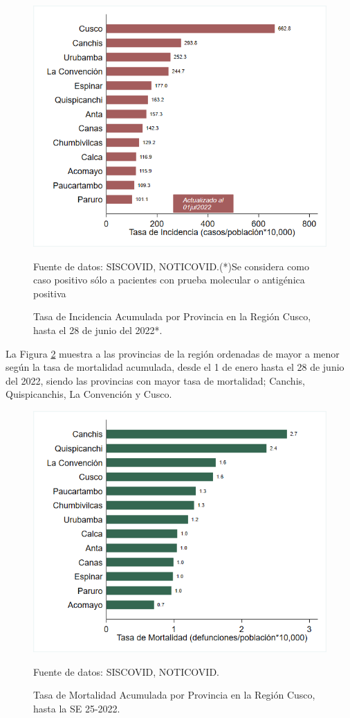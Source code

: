 \documentclass[12pt,a4paper,openany]{book}
\begin{document}
	\begin{figure}[!htpb]
		\caption{Tasa de Incidencia Acumulada por Provincia en la Región Cusco, hasta el 28 de junio del 2022*. }\label{fig:incidencia_provincias}
		\begin{center}
			\includegraphics[width=0.60\linewidth]{../figuras/incidencia_provincial_2022.png}
		\end{center}
		{\footnotesize {
				Fuente de datos: SISCOVID, NOTICOVID.(*)Se considera como caso positivo sólo a pacientes con prueba molecular o antigénica positiva}}
	\end{figure}
	
	La Figura \ref{fig:mortalidad_ordenada} muestra a las provincias de la región ordenadas de mayor a menor según la tasa de mortalidad acumulada, desde el 1 de enero hasta el 28 de junio del 2022, siendo las provincias con mayor tasa de mortalidad;  Canchis, Quispicanchis, La Convención y Cusco.  
	
	\begin{figure}[h]
		\caption{Tasa de Mortalidad Acumulada por Provincia en la Región Cusco, hasta la SE 25-2022. }\label{fig:mortalidad_ordenada}
		\begin{center}
			\includegraphics[width=0.60\linewidth]{../figuras/mortalidad_provincial_2022.png}
		\end{center}
		{\footnotesize {Fuente de datos: SISCOVID, NOTICOVID.}}
	\end{figure}
	
\end{document}

